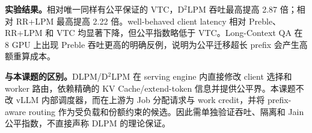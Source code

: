 \documentclass[10pt,a4paper]{ctexart}
\newcommand{\field}[1]{\par\noindent\textbf{#1。}\hspace{0.25em}}
\begin{document}
\field{实验结果}相对唯一同样有公平保证的 VTC，D$^2$LPM 吞吐最高提高 2.87 倍；相对 RR+LPM 最高提高 2.22 倍。well-behaved client latency 相对 Preble、RR+LPM 和 VTC 均显著下降，但公平指数略低于 VTC。Long-Context QA 在 8 GPU 上出现 Preble 吞吐更高的明确反例，说明为公平迁移超长 prefix 会产生高额重算成本。

\field{与本课题的区别}DLPM/D$^2$LPM 在 serving engine 内直接修改 client 选择和 worker 路由，依赖精确的 KV Cache/extend-token 信息并提供公平界。本课题不改 vLLM 内部调度器，而在上游为 Job 分配请求与 work credit，并将 prefix-aware routing 作为受负载和份额约束的候选。因此需单独验证吞吐、隔离和 Jain 公平指数，不直接声称 DLPM 的理论保证。
\end{document}
